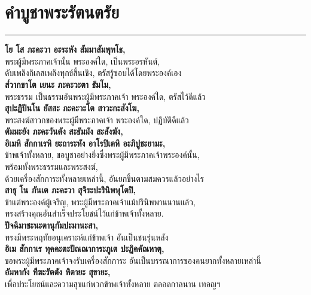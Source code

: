 \documentclass[12pt]{article}
\begin{document}
\pagebreak
\vspace*{\fill}
\begin{center}
\end{center}
\vspace{\fill}

\pagebreak

\section{คำบูชาพระรัตนตรัย}
\hrule
\textbf{โย โส ภะคะวา อะระหัง สัมมาสัมพุทโธ,}\\
\indent พระผู้มีพระภาคเจ้านั้น พระองค์ใด, เป็นพระอรหันต์,\\
\indent ดับเพลิงกิเลสเพลิงทุกข์สิ้นเชิง, ตรัสรู้ชอบได้โดยพระองค์เอง\\
\textbf{ส๎วากขาโต เยนะ ภะคะวะตา ธัมโม, }\\
\indent พระธรรม เป็นธรรมอันพระผู้มีพระภาคเจ้า พระองค์ใด, ตรัสไว้ดีแล้ว\\
\textbf{สุปะฏิปันโน ยัสสะ ภะคะวะโต สาวะกะสังโฆ,}\\
\indent พระสงฆ์สาวกของพระผู้มีพระภาคเจ้า พระองค์ใด, ปฏิบัติดีแล้ว\\
\textbf{ตัมมะยัง ภะคะวันตัง สะธัมมัง สะสังฆัง,\\
อิเมหิ สักกาเรหิ ยะถาระหัง อาโรปิเตหิ อะภิปูชะยามะ,}\\
\indent ข้าพเจ้าทั้งหลาย, ขอบูชาอย่างยิ่งซึ่งพระผู้มีพระภาคเจ้าพระองค์นั้น,\\
\indent พร้อมทั้งพระธรรมและพระสงฆ์,\\
\indent ด้วยเครื่องสักการะทั้งหลายเหล่านี้, อันยกขึ้นตามสมควรแล้วอย่างไร\\
\textbf{สาธุ โน ภันเต ภะคะวา สุจิระปะรินิพพุโตปิ,}\\
\indent ข้าแต่พระองค์ผู้เจริญ, พระผู้มีพระภาคเจ้าแม้ปรินิพพานนานแล้ว,\\
\indent ทรงสร้างคุณอันสำเร็จประโยชน์ไว้แก่ข้าพเจ้าทั้งหลาย.\\
\textbf{ปัจฉิมาชะนะตานุกัมปะมานะสา,}\\
\indent ทรงมีพระหฤทัยอนุเคราะห์แก่ข้าพเจ้า อันเป็นชนรุ่นหลัง\\
\textbf{อิเม สักกาเร ทุคคะตะปัณณาการะภูเต ปะฏิคคัณหาตุ,}\\
\indent ขอพระผู้มีพระภาคเจ้าจงรับเครื่องสักการะ อันเป็นบรรณาการของคนยากทั้งหลายเหล่านี้\\
\textbf{อัมหากัง ทีฆะรัตตัง หิตายะ สุขายะ,}\\
\indent เพื่อประโยชน์และความสุขแก่พวกข้าพเจ้าทั้งหลาย ตลอดกาลนาน เทอญฯ\\
\end{document}
